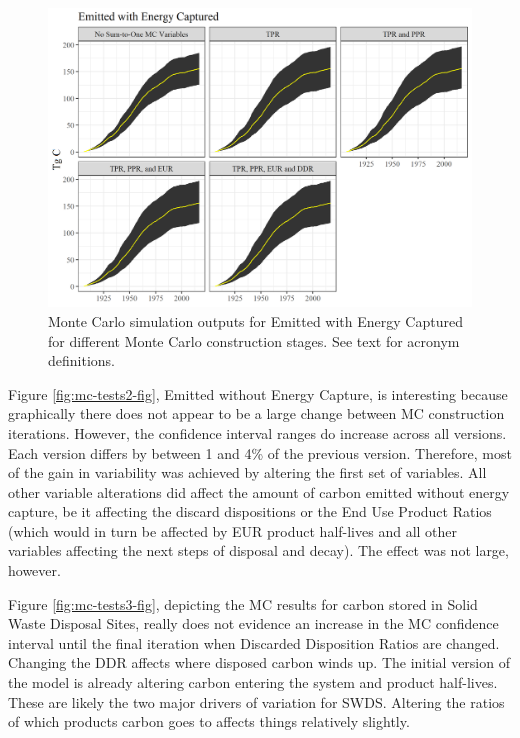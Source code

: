 \documentclass[
  openany]{book}
\begin{document}
\begin{figure}
\includegraphics[width=1\linewidth]{images/MC_tests} \caption{Monte Carlo simulation outputs for Emitted with Energy Captured for different Monte Carlo construction stages.  See text for acronym definitions.}\label{fig:mc-tests-fig}
\end{figure}

Figure \ref{fig:mc-tests2-fig}, Emitted without Energy Capture, is interesting because graphically there does not appear to be a large change between MC construction iterations. However, the confidence interval ranges do increase across all versions. Each version differs by between 1 and 4\% of the previous version. Therefore, most of the gain in variability was achieved by altering the first set of variables. All other variable alterations did affect the amount of carbon emitted without energy capture, be it affecting the discard dispositions or the End Use Product Ratios (which would in turn be affected by EUR product half-lives and all other variables affecting the next steps of disposal and decay). The effect was not large, however.

Figure \ref{fig:mc-tests3-fig}, depicting the MC results for carbon stored in Solid Waste Disposal Sites, really does not evidence an increase in the MC confidence interval until the final iteration when Discarded Disposition Ratios are changed. Changing the DDR affects where disposed carbon winds up. The initial version of the model is already altering carbon entering the system and product half-lives. These are likely the two major drivers of variation for SWDS. Altering the ratios of which products carbon goes to affects things relatively slightly.
\end{document}
